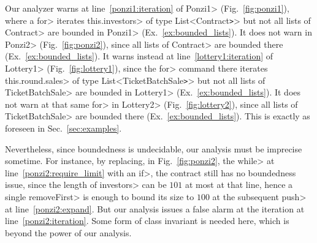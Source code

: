 %
\begin{example}\label{ex:warnings}
  Our analyzer warns at line~\ref{ponzi1:iteration} of
  \<Ponzi1> (Fig.~\ref{fig:ponzi1}), where a \<for> iterates
  \<this.investors> of type \<List<Contract\texttt{>}> but not all lists of
  \<Contract> are bounded in \<Ponzi1> (Ex.~\ref{ex:bounded_lists}).
  It does not warn
  in \<Ponzi2> (Fig.~\ref{fig:ponzi2}), since all lists of \<Contract> are bounded there
  (Ex.~\ref{ex:bounded_lists}). It warns instead
  at line~\ref{lottery1:iteration} of \<Lottery1> (Fig.~\ref{fig:lottery1}),
  since the \<for> command there iterates \<this.round.sales> of type
  \<List<TicketBatchSale\texttt{>}> but not all lists of
  \<TicketBatchSale> are bounded in \<Lottery1> (Ex.~\ref{ex:bounded_lists}).
  It does not warn at that same \<for> in \<Lottery2>
  (Fig.~\ref{fig:lottery2}), since all lists of \<TicketBatchSale> are bounded there
  (Ex.~\ref{ex:bounded_lists}). This is exactly
  as foreseen in Sec.~\ref{sec:examples}.
\end{example}
%
Nevertheless, since boundedness is undecidable,
our analysis must be imprecise sometime. For instance, by replacing, in Fig.~\ref{fig:ponzi2},
the \<while> at line~\ref{ponzi2:require_limit} with an \<if>, the contract
still has no boundedness issue, since the length of \<investors> can
be $101$ at most at that line, hence a single \<removeFirst> is enough to bound its size
to $100$ at the subsequent \<push> at line~\ref{ponzi2:expand}. But our analysis
issues a false alarm at the iteration at line~\ref{ponzi2:iteration}.
Some form of class invariant is needed here, which is beyond the power
of our analysis.
